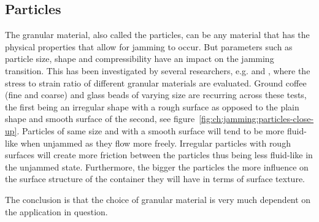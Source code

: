 \subsection{Particles}
\label{ch:jamming:particles}
The granular material, also called the particles, can be any material that has the physical properties that allow for jamming to occur. 
But parameters such as particle size, shape and compressibility have an impact on the jamming transition. 
This has been investigated by several researchers, e.g. \cite{cheng2012design} and \cite{steltz2010jamming}, where the stress to strain ratio of different granular materials are evaluated. 
Ground coffee (fine and coarse) and glass beads of varying size are recurring across these tests, the first being an irregular shape with a rough surface as opposed to the plain shape and smooth surface of the second, see figure~\ref{fig:ch:jamming:particles-close-up}. 
Particles of same size and with a smooth surface will tend to be more fluid-like when unjammed as they flow more freely. 
Irregular particles with rough surfaces will create more friction between the particles thus being less fluid-like in the unjammed state.
Furthermore, the bigger the particles the more influence on the surface structure of the container they will have in terms of surface texture.

The conclusion is that the choice of granular material is very much dependent on the application in question. 

